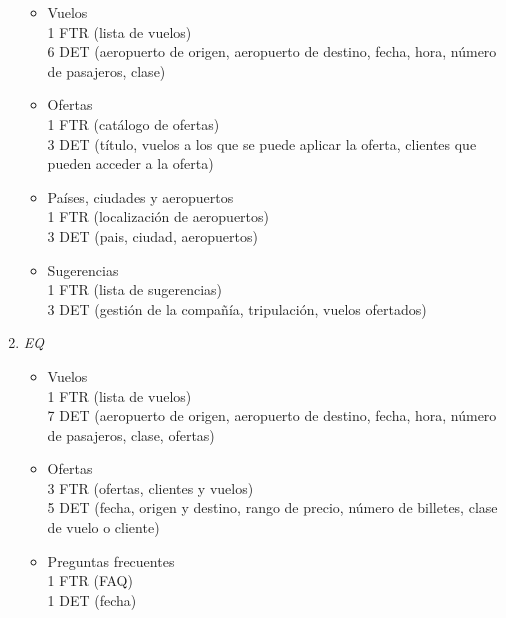\begin{enumerate}
				\begin{itemize}
					\item Vuelos \\
					{1 FTR (lista de vuelos)}\\
					{6 DET (aeropuerto de origen, aeropuerto de destino, fecha, hora, número de pasajeros, clase)}\\
					\item Ofertas \\
					{1 FTR (catálogo de ofertas)}\\
					{3 DET (título, vuelos a los que se puede aplicar la oferta, clientes que pueden acceder a la oferta)}\\
					\item Países, ciudades y aeropuertos \\
					{1 FTR (localización de aeropuertos)}\\
					{3 DET (pais, ciudad, aeropuertos)}\\
					\item Sugerencias \\
					{1 FTR (lista de sugerencias)}\\
					{3 DET (gestión de la compañía, tripulación, vuelos ofertados)}\\
				\end{itemize}

			\item \textit{EQ}
	
				\begin{itemize}
					\item Vuelos \\
					{1 FTR (lista de vuelos)}\\
					{7 DET (aeropuerto de origen, aeropuerto de destino, fecha, hora, número de pasajeros, clase, ofertas)}\\
					\item Ofertas \\
					{3 FTR (ofertas, clientes y vuelos)}\\
					{5 DET (fecha, origen y destino, rango de precio, número de billetes, clase de vuelo o cliente)}\\
					\item Preguntas frecuentes \\
					{1 FTR (FAQ)}\\
					{1 DET (fecha)}\\
				\end{itemize}
			
		\end{enumerate}